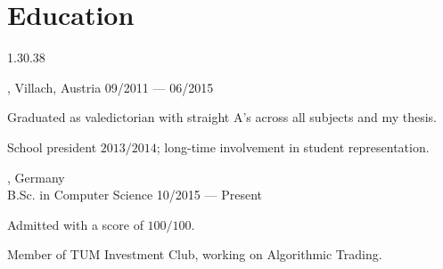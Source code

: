 \section{Education}{1.3}{0.38}
\begin{entry}
	{, Villach, Austria}{}
	{09/2011 --- 06/2015}
	\item Graduated as valedictorian with straight A's across all subjects and my thesis.
	\item School president $2013/2014$; long-time involvement in student representation.
\end{entry}
\begin{entry}
	{, Germany}
	{\\B.Sc. in Computer Science}
	{10/2015 --- Present}
	\item Admitted with a score of $100/100$.
  \item Member of TUM Investment Club, working on Algorithmic Trading.
\end{entry}


